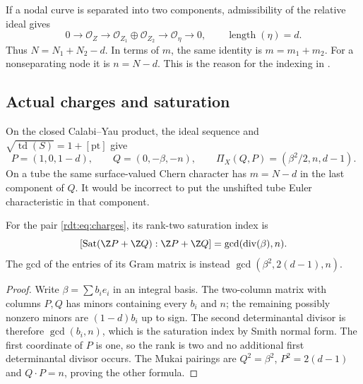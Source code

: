 If a nodal curve is separated into two components, admissibility of the
relative ideal gives
\begin{equation}\label{rdt:eq:normalization}
 0\longrightarrow\mathcal O_Z\longrightarrow
 \mathcal O_{Z_1}\oplus\mathcal O_{Z_2}
 \longrightarrow\mathcal O_\eta\longrightarrow0,
 \qquad \operatorname{length}(\eta)=d.
\end{equation}
Thus $N=N_1+N_2-d$. In terms of $m$, the same identity is $m=m_1+m_2$.
For a nonseparating node it is $n=N-d$. This is the reason for the
indexing in \cite[Remark 5.1]{OberdieckMC}.

\subsection{Actual charges and saturation}

On the closed Calabi--Yau product, the ideal sequence and
$\sqrt{\operatorname{td}(S)}=1+[\mathrm{pt}]$ give
\begin{equation}\label{rdt:eq:charges}
 P=(1,0,1-d),\qquad Q=(0,-\beta,-n),\qquad
 \Pi_X(Q,P)=(\beta^2/2,n,d-1).
\end{equation}
On a tube the same surface-valued Chern character has $m=N-d$ in the
last component of $Q$. It would be incorrect to put the unshifted
tube Euler characteristic in that component.

\begin{proposition}\label{rdt:prop:wedge}
For the pair \eqref{rdt:eq:charges}, its rank-two saturation index is
\[
 [\operatorname{Sat}(\Z P+\Z Q):\Z P+\Z Q]=\gcd(\operatorname{div}(\beta),n).
\]
The gcd of the entries of its Gram matrix is instead
$\gcd(\beta^2,2(d-1),n)$.
\end{proposition}
\begin{proof}
Write $\beta=\sum b_i e_i$ in an integral basis. The two-column
matrix with columns $P,Q$ has minors containing every $b_i$ and $n$;
the remaining possibly nonzero minors are $(1-d)b_i$ up to sign.
The second determinantal divisor is therefore $\gcd(b_i,n)$, which is
the saturation index by Smith normal form. The first coordinate of
$P$ is one, so the rank is two and no additional first determinantal
divisor occurs. The Mukai pairings are $Q^2=\beta^2$,
$P^2=2(d-1)$ and $Q\cdot P=n$, proving the other formula.
\end{proof}

